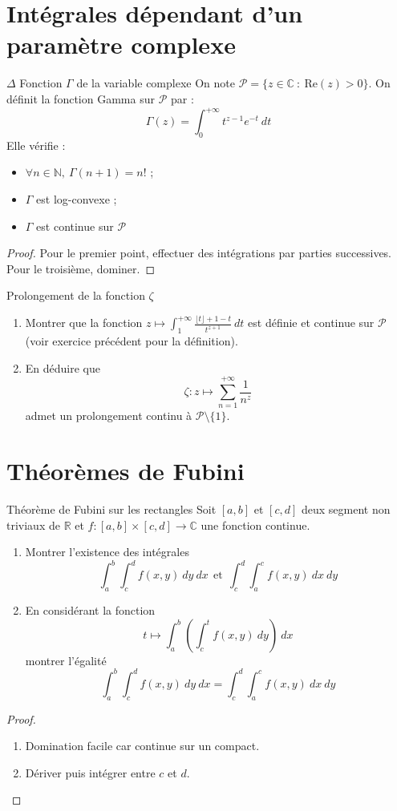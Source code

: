 \documentclass[french,a4paper]{article}
\newcommand{\N}{\mathbb{N}}
\newcommand{\R}{\mathbb{R}}
\newcommand{\C}{\mathbb{C}}
\theoremstyle{plain}
\theoremstyle{definition}
\theoremstyle{remark}
\begin{document}
\section{Intégrales dépendant d'un paramètre complexe}
\begin{ex}[Moulin.IP.31]{$\Delta$ Fonction $\Gamma$ de la variable complexe}
	On note $\mathcal{P}=\{z\in\C\ : \ \text{Re}(z)>0\}$. On définit la fonction Gamma sur $\mathcal{P}$ par : $$\Gamma(z)=\int_{0}^{+\infty}t^{z-1}e^{-t}\ dt$$ Elle vérifie : 
	\begin{itemize}
		\item $\forall n\in\N,\ \Gamma(n+1)=n!$ ;
		\item $\Gamma$ est log-convexe ;
		\item $\Gamma$ est continue sur $\mathcal{P}$
	\end{itemize}
\end{ex}
\begin{proof}
	Pour le premier point, effectuer des intégrations par parties successives. Pour le troisième, dominer.
\end{proof}

\begin{ex}[Moulin.IP.32]{Prolongement de la fonction $\zeta$}
	\begin{enumerate}
		\item Montrer que la fonction $z\mapsto\displaystyle\int_{1}^{+\infty}\frac{\lfloor t\rfloor+1-t}{t^{z+1}}\ dt$ est définie et continue sur $\mathcal{P}$ (voir exercice précédent pour la définition).
		\item En déduire que $$\zeta:z\mapsto\sum_{n=1}^{+\infty}\frac{1}{n^z}$$ admet un prolongement continu à $\mathcal{P}\setminus\{1\}$.
	\end{enumerate}
\end{ex}

\section{Théorèmes de Fubini}

\begin{ex}[Moulin.IP.33]{Théorème de Fubini sur les rectangles}
	Soit $[a,b]$ et $[c,d]$ deux segment non triviaux de $\R$ et $f:[a,b]\times[c,d]\to\C$ une fonction continue.
	\begin{enumerate}
		\item Montrer l'existence des intégrales $$\int_{a}^{b}\int_{c}^{d}f(x,y)\ dy\ dx \ \ \text{et} \ \ \int_{c}^{d}\int_{a}^{c}f(x,y)\ dx\ dy$$
		\item En considérant la fonction $$t\mapsto \int_{a}^{b}\left(\int_{c}^{t}f(x,y)\ dy\right)\ dx$$ montrer l'égalité $$\int_{a}^{b}\int_{c}^{d}f(x,y)\ dy\ dx =\int_{c}^{d}\int_{a}^{c}f(x,y)\ dx\ dy$$
	\end{enumerate}
\end{ex}
\begin{proof}
	\begin{enumerate}
		\item Domination facile car continue sur un compact.
		\item Dériver puis intégrer entre $c$ et $d$.
	\end{enumerate}
\end{proof}
\end{document}
